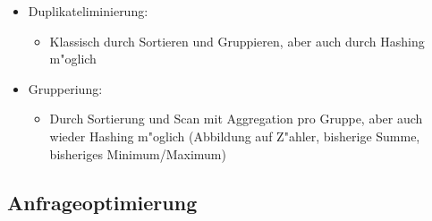 \documentclass[a4paper, 12pt]{scrartcl}
\begin{document}
\begin{itemize}
	\item
		Duplikateliminierung:
		\begin{itemize}
			\item
				Klassisch durch Sortieren und Gruppieren, aber auch durch Hashing m"oglich
		\end{itemize}
	\item
		Grupperiung:
		\begin{itemize}
			\item
				Durch Sortierung und Scan mit Aggregation pro Gruppe, aber auch wieder Hashing m"oglich (Abbildung auf Z"ahler, bisherige Summe, bisheriges Minimum/Maximum)
		\end{itemize}

\end{itemize}
\subsection{Anfrageoptimierung}
\end{document}
